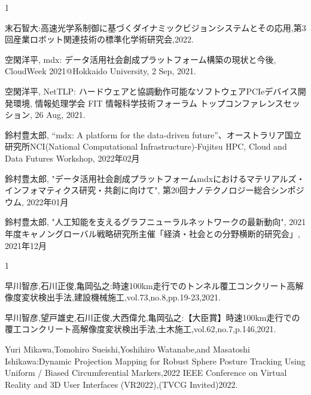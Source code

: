 \begin{招待講演}{1}

末石智大:高速光学系制御に基づくダイナミックビジョンシステムとその応用,第3回産業ロボット関連技術の標準化学術研究会,2022.

空閑洋平, mdx: データ活用社会創成プラットフォーム構築の現状と今後, CloudWeek 2021@Hokkaido University, 2 Sep, 2021.

空閑洋平, NetTLP: ハードウェアと協調動作可能なソフトウェアPCIeデバイス開発環境, 情報処理学会 FIT 情報科学技術フォーラム トップコンファレンスセッション, 26 Aug, 2021.




鈴村豊太郎, “mdx: A platform for the data-driven future”、オーストラリア国立研究所NCI(National Computational Infrastructure)-Fujitsu HPC, Cloud and Data Futures Workshop, 2022年02月

鈴村豊太郎, "データ活用社会創成プラットフォームmdxにおけるマテリアルズ・インフォマティクス研究・共創に向けて", 第20回ナノテクノロジー総合シンポジウム, 2022年01月

鈴村豊太郎, "人工知能を支えるグラフニューラルネットワークの最新動向", 2021年度キャノングローバル戦略研究所主催「経済・社会との分野横断的研究会」, 2021年12月


\end{招待講演}

\begin{招待論文}{1}

早川智彦,石川正俊,亀岡弘之:時速100km走行でのトンネル覆工コンクリート高解像度変状検出手法,建設機械施工,vol.73,no.8,pp.19-23,2021.

早川智彦,望戸雄史,石川正俊,大西偉允,亀岡弘之:【大臣賞】時速100km走行での覆工コンクリート高解像度変状検出手法,土木施工,vol.62,no.7,p.146,2021.

Yuri Mikawa,Tomohiro Sueishi,Yoshihiro Watanabe,and Masatoshi Ishikawa:Dynamic Projection Mapping for Robust Sphere Posture Tracking Using Uniform / Biased Circumferential Markers,2022 IEEE Conference on Virtual Reality and 3D User Interfaces (VR2022),(TVCG Invited)2022.


\end{招待論文}

